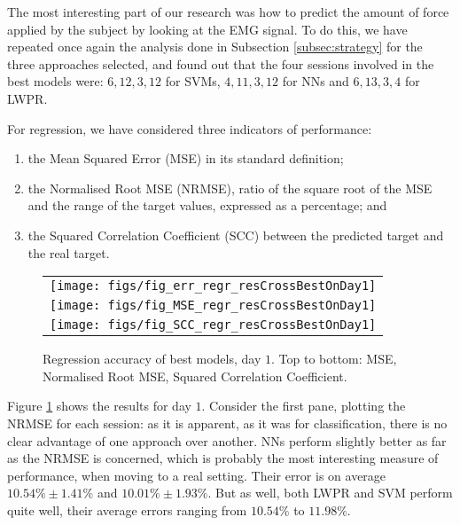 The most interesting part of our research was how to predict the
amount of force applied by the subject by looking at the EMG
signal. To do this, we have repeated once again the analysis done in
Subsection \ref{subsec:strategy} for the three approaches selected,
and found out that the four sessions involved in the best models were:
$6,12,3,12$ for SVMs, $4,11,3,12$ for NNs and $6,13,3,4$ for LWPR.

For regression, we have considered three indicators of performance:

\begin{enumerate}

  \item the Mean Squared Error (MSE) in its standard definition;

  \item the Normalised Root MSE (NRMSE), ratio of the square root of
    the MSE and the range of the target values, expressed as a
    percentage; and

  \item the Squared Correlation Coefficient (SCC) between the
    predicted target and the real target.

\end{enumerate}

\begin{figure}\centering
  \begin{tabular}{c}
    \texttt{[image: figs/fig\_err\_regr\_resCrossBestOnDay1]}\\
    \texttt{[image: figs/fig\_MSE\_regr\_resCrossBestOnDay1]} \\
    \texttt{[image: figs/fig\_SCC\_regr\_resCrossBestOnDay1]} \\
  \end{tabular}
  \caption{Regression accuracy of best models, day $1$. Top to bottom:
    MSE, Normalised Root MSE, Squared Correlation Coefficient.}
  \label{fig:best_regr}
\end{figure}

Figure \ref{fig:best_regr} shows the results for day $1$. Consider the
first pane, plotting the NRMSE for each session: as it is apparent, as
it was for classification, there is no clear advantage of one approach
over another. NNs perform slightly better as far as the NRMSE is
concerned, which is probably the most interesting measure of
performance, when moving to a real setting. Their error is on average
$10.54\% \pm 1.41\%$ and $10.01\% \pm 1.93\%$. But as well, both LWPR
and SVM perform quite well, their average errors ranging from
$10.54\%$ to $11.98\%$.


